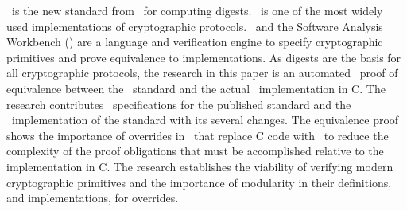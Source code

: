 \shaThree\ is the new standard from \nist\ for computing digests. 
\openssl\ is one of the most widely used implementations of cryptographic protocols.
\cryptol\ and the Software Analysis Workbench (\saw) are a language and verification engine to specify cryptographic primitives and prove equivalence to implementations.
As digests are the basis for all cryptographic protocols, the research in this paper is an automated \saw\ proof of equivalence between the \shaThree\ standard and the actual \openssl\ implementation in C.
The research contributes \cryptol\ specifications for the published standard and the \openssl\ implementation of the standard with its several changes.
The equivalence proof shows the importance of overrides in \saw\ that replace C code with \cryptol\ to reduce the complexity of the proof obligations that must be accomplished relative to the implementation in C.
The research establishes the viability of verifying modern cryptographic primitives and the importance of modularity in their definitions, and implementations, for overrides.

